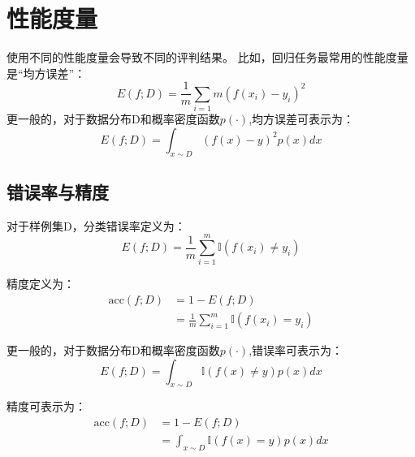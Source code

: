 \section{性能度量}
使用不同的性能度量会导致不同的评判结果。
比如，回归任务最常用的性能度量是“均方误差”：
\begin{equation}
    E(f;D)=\frac{1}{m}\sum_{i=1}{m}(f(x_i)-y_i)^2
\end{equation}
更一般的，对于数据分布D和概率密度函数$p(\cdot)$,均方误差可表示为：
\begin{equation}
    E(f;D)=\int_{x\sim D} (f(x)-y)^2 p(x)dx
\end{equation}
\subsection{错误率与精度}
对于样例集D，分类错误率定义为：
\begin{equation}
    E(f;D)=\frac{1}{m}\sum_{i=1}^{m} \mathbb{I}(f(x_i)\neq y_i)
\end{equation}

精度定义为：
\begin{align}
   \text{acc}(f;D) &= 1 - E(f;D) \nonumber \\
    &= \frac{1}{m} \sum_{i=1}^{m} \mathbb{I}(f(x_i) = y_i)
\end{align}

更一般的，对于数据分布D和概率密度函数$p(\cdot)$,错误率可表示为：
\begin{equation}
    E(f;D)=\int_{x\sim D} \mathbb{I}(f(x)\neq y) p(x)dx
\end{equation}

精度可表示为：
\begin{align}
    \text{acc}(f;D) &= 1 - E(f;D) \nonumber \\
    &= \int_{x\sim D} \mathbb{I}(f(x) = y) p(x)dx
\end{align}
